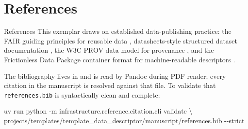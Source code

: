 \documentclass[
  ignorenonframetext,
]{beamer}
\author{\texorpdfstring{}{}}
\date{}
\newenvironment{Shaded}{}{}
\newcommand{\AttributeTok}[1]{\textcolor[rgb]{0.49,0.56,0.16}{#1}}
\newcommand{\DataTypeTok}[1]{\textcolor[rgb]{0.56,0.13,0.00}{#1}}
\newcommand{\ExtensionTok}[1]{#1}
\newcommand{\NormalTok}[1]{#1}
\begin{document}
\section{References}\label{sec:references}

\begin{frame}{References}
This exemplar draws on established data-publishing practice: the FAIR
guiding principles for reusable data ,
datasheets-style structured dataset documentation
, the W3C PROV data model for provenance
, and the Frictionless Data Package container
format for machine-readable descriptors
.

The bibliography lives in
\href{references.bib}{} and is read by
Pandoc during PDF render; every \texttt{\breakseq{[@key]}} citation in the
manuscript is resolved against that file. To validate that
\texttt{references.bib} is syntactically clean and complete:

\begin{Shaded}
\begin{Highlighting}[]
\ExtensionTok{uv}\NormalTok{ run python }\AttributeTok{{-}m}\NormalTok{ infrastructure.reference.citation.cli validate }\DataTypeTok{\textbackslash{}}
\NormalTok{    projects/templates/template\_data\_descriptor/manuscript/references.bib }\AttributeTok{{-}{-}strict}
\end{Highlighting}
\end{Shaded}
\end{frame}
\end{document}
